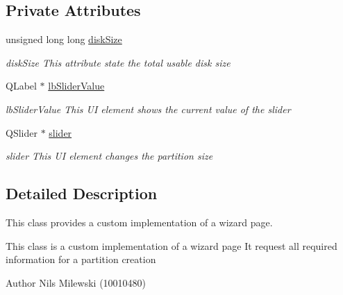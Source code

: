\subsection*{Private Attributes}
\begin{DoxyCompactItemize}
\item 
\mbox{\label{classui_1_1wizard_1_1pages_1_1_partition_page_a79050f29e018d84c862fed6fe70bb91c}} 
unsigned long long \mbox{\hyperlink{classui_1_1wizard_1_1pages_1_1_partition_page_a79050f29e018d84c862fed6fe70bb91c}{disk\+Size}}
\begin{DoxyCompactList}\small\item\em disk\+Size This attribute state the total usable disk size \end{DoxyCompactList}\item 
\mbox{\label{classui_1_1wizard_1_1pages_1_1_partition_page_a62c449957b198f8c748391509bd5ac7a}} 
Q\+Label $\ast$ \mbox{\hyperlink{classui_1_1wizard_1_1pages_1_1_partition_page_a62c449957b198f8c748391509bd5ac7a}{lb\+Slider\+Value}}
\begin{DoxyCompactList}\small\item\em lb\+Slider\+Value This UI element shows the current value of the slider \end{DoxyCompactList}\item 
\mbox{\label{classui_1_1wizard_1_1pages_1_1_partition_page_a0beeb7a451145d8a128160a6ec9a4eef}} 
Q\+Slider $\ast$ \mbox{\hyperlink{classui_1_1wizard_1_1pages_1_1_partition_page_a0beeb7a451145d8a128160a6ec9a4eef}{slider}}
\begin{DoxyCompactList}\small\item\em slider This UI element changes the partition size \end{DoxyCompactList}\end{DoxyCompactItemize}


\subsection{Detailed Description}
This class provides a custom implementation of a wizard page. 

This class is a custom implementation of a wizard page It request all required information for a partition creation \begin{DoxyAuthor}{Author}
Nils Milewski (10010480) 
\end{DoxyAuthor}


